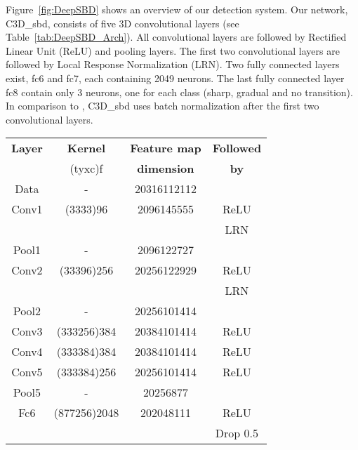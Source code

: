 \documentclass[journal]{IEEEtran}
\begin{document}
Figure~\ref{fig:DeepSBD} shows an overview of our detection system. Our network, C3D\_{sbd}, consists of five 3D convolutional layers (see Table~\ref{tab:DeepSBD_Arch}). All convolutional layers are followed by Rectified Linear Unit (ReLU) and pooling layers. The first two convolutional layers are followed by Local Response Normalization (LRN). Two fully connected layers exist, fc6 and fc7, each containing 2049 neurons. The last fully connected layer fc8 contain only 3 neurons, one for each class (sharp, gradual and no transition). In comparison to \cite{Tran15}, C3D\_{sbd} uses batch normalization after the first two convolutional layers. 


\begin{table}
\small
\begin{tabular}{|c|c|c|c|}
\hline
\textbf{Layer}   & \textbf{Kernel} & \textbf{Feature map} & \textbf{Followed} \\ 
                 & (tyxc)f             &    \textbf{dimension}  & \textbf{    by   }                      \\ \hline
Data    & -                           & 20316112112                 &                     \\ \hline
Conv1   & (3333)96                & 2096145555                  & ReLU                \\ 
        &                             &                                 & LRN                 \\ \hline
Pool1   & -                           & 2096122727                  &                     \\ \hline
Conv2   & (33396)256              & 20256122929                 & ReLU                \\ 
        &                             &                                 & LRN                 \\ \hline
Pool2   & -                           & 20256101414                 &                     \\ \hline
Conv3   & (333256)384             & 20384101414                 & ReLU                \\ \hline
Conv4   & (333384)384             & 20384101414                 & ReLU                \\ \hline
Conv5   & (333384)256             & 20256101414                 & ReLU                \\ \hline
Pool5   & -                           & 20256877                    &                     \\ \hline
Fc6     & (877256)2048            & 202048111                   & ReLU                 \\ 
        &                             &                                 & Drop 0.5                 \\ \hline


\end{tabular}
\end{table}
\end{document}
